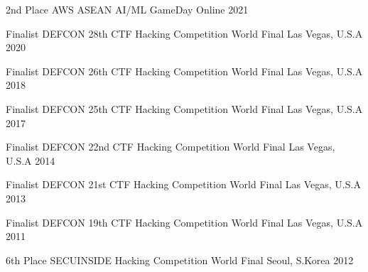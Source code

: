 



\begin{cvhonors}

  \cvhonor
    {2nd Place} %
    {AWS ASEAN AI/ML GameDay} %
    {Online} %
    {2021} %

  \cvhonor
    {Finalist} %
    {DEFCON 28th CTF Hacking Competition World Final} %
    {Las Vegas, U.S.A} %
    {2020} %

  \cvhonor
    {Finalist} %
    {DEFCON 26th CTF Hacking Competition World Final} %
    {Las Vegas, U.S.A} %
    {2018} %

  \cvhonor
    {Finalist} %
    {DEFCON 25th CTF Hacking Competition World Final} %
    {Las Vegas, U.S.A} %
    {2017} %

  \cvhonor
    {Finalist} %
    {DEFCON 22nd CTF Hacking Competition World Final} %
    {Las Vegas, U.S.A} %
    {2014} %

  \cvhonor
    {Finalist} %
    {DEFCON 21st CTF Hacking Competition World Final} %
    {Las Vegas, U.S.A} %
    {2013} %

  \cvhonor
    {Finalist} %
    {DEFCON 19th CTF Hacking Competition World Final} %
    {Las Vegas, U.S.A} %
    {2011} %

  \cvhonor
    {6th Place} %
    {SECUINSIDE Hacking Competition World Final} %
    {Seoul, S.Korea} %
    {2012} %

\end{cvhonors}


